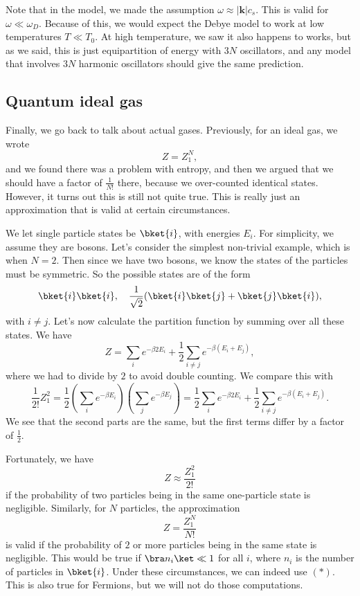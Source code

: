 \documentclass[a4paper]{article}
\begin{document}
Note that in the model, we made the assumption $\omega \approx |\mathbf{k}| c_s$. This is valid for $\omega \ll \omega_D$. Because of this, we would expect the Debye model to work at low temperatures $T \ll T_0$. At high temperature, we saw it also happens to works, but as we said, this is just equipartition of energy with $3N$ oscillators, and any model that involves $3N$ harmonic oscillators should give the same prediction.

\subsection{Quantum ideal gas}
Finally, we go back to talk about actual gases. Previously, for an ideal gas, we wrote
\[
  Z = Z_1^N,
\]
and we found there was a problem with entropy, and then we argued that we should have a factor of $\frac{1}{N!}$ there, because we over-counted identical states. However, it turns out this is still not quite true. This is really just an approximation that is valid at certain circumstances.

We let single particle states be $\bket{i}$, with energies $E_i$. For simplicity, we assume they are bosons. Let's consider the simplest non-trivial example, which is when $N = 2$. Then since we have two bosons, we know the states of the particles must be symmetric. So the possible states are of the form
\[
  \bket{i}\bket{i},\quad \frac{1}{\sqrt{2}} (\bket{i} \bket{j} + \bket{j} \bket{i}),
\]
with $i \not= j$. Let's now calculate the partition function by summing over all these states. We have
\[
  Z = \sum_i e^{-\beta 2 E_i} + \frac{1}{2}\sum_{i \not= j}e^{-\beta (E_i + E_j)},
\]
where we had to divide by $2$ to avoid double counting. We compare this with
\[
  \frac{1}{2!} Z_1^2 = \frac{1}{2} \left( \sum_i e^{-\beta E_i} \right)\left(\sum_j e^{-\beta E_j}\right) = \frac{1}{2} \sum_i e^{-\beta 2E_i} + \frac{1}{2} \sum_{i \not= j} e^{-\beta(E_i + E_j)}.
\]
We see that the second parts are the same, but the first terms differ by a factor of $\frac{1}{2}$.

Fortunately, we have
\[
  Z \approx \frac{Z_1^2}{2!}
\]
if the probability of two particles being in the same one-particle state is negligible. Similarly, for $N$ particles, the approximation
\[
  Z = \frac{Z_1^N}{N!}\tag{$*$}
\]
is valid if the probability of $2$ or more particles being in the same state is negligible. This would be true if $\bra n_i\ket \ll 1$ for all $i$, where $n_i$ is the number of particles in $\bket{i}$. Under these circumstances, we can indeed use $(*)$. This is also true for Fermions, but we will not do those computations.
\end{document}
